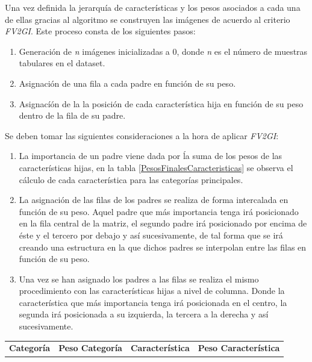 \begin{enumerate}
            Una vez definida la jerarquía de características y los pesos asociados a cada una de ellas gracias al algoritmo  se construyen las imágenes de acuerdo al criterio \textit{FV2GI}. Este proceso consta de los siguientes pasos:

            \begin{enumerate}

                \item Generación de \textit{n} imágenes inicializadas a 0, donde \textit{n} es el número de muestras tabulares en el dataset.
                \item Asignación de una fila a cada padre en función de su peso.
                \item Asignacíón de la la posición de cada característica hija en función de su peso dentro de la fila de su padre.
            
            \end{enumerate}

            Se deben tomar las siguientes consideraciones a la hora de aplicar \textit{FV2GI}:

            \begin{enumerate}

                \item La importancia de un padre viene dada por ĺa suma de los pesos de las características hijas, en la tabla \ref{PesosFinalesCaracteristicas} se observa el cálculo de cada característica para las categorías principales.

                \item La asignación de las filas de los padres se realiza de forma intercalada en función de su peso. Aquel padre que más importancia tenga irá posicionado en la fila central de la matriz, el segundo padre irá posicionado por encima de éste y el tercero por debajo y así sucesivamente, de tal forma que se irá creando una estructura en la que dichos padres se interpolan entre las filas en función de su peso.

                \item Una vez se han asignado los padres a las filas se realiza el mismo procedimiento con las características hijas a nivel de columna. Donde la característica que más importancia tenga irá posicionada en el centro, la segunda irá posicionada a su izquierda, la tercera a la derecha y así sucesivamente.
            \end{enumerate}


            \begin{table}[H]
              \centering
              \begin{tabular}{ |c|c|c|c| }
                   \hline
                   \textbf{Categoría} & \textbf{Peso Categoría} & \textbf{Característica} & \textbf{Peso Característica}\\


\end{tabular}
\end{table}
\end{enumerate}
